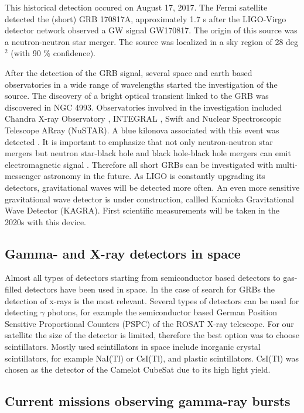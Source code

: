 \documentclass[12pt, a4paper,titlepage]{article}
\numberwithin{equation}{section}
\numberwithin{figure}{section}
\begin{document}
This historical detection occured on August 17, 2017. The Fermi satellite detected the (short) GRB 170817A, approximately 1.7 s after the LIGO-Virgo detector network observed a GW signal GW170817. The origin of this source was a neutron-neutron star merger. The source was localized  in a sky region of 28 deg$^{2}$ (with 90 \% confidence). 

After the detection of the GRB signal, several space and earth based observatories in a wide range of wavelengths started the investigation of the source. The discovery of a bright optical transient linked to the GRB was discovered in NGC 4993. Observatories involved in the investigation included Chandra X-ray Observatory \cite{grb23}, INTEGRAL \cite{grb22}, Swift and Nuclear Spectroscopic Telescope ARray (NuSTAR). A blue kilonova associated with this event was detected \cite{grb24}. It is important to emphasize that not only neutron-neutron star mergers but neutron star-black hole and black hole-black hole mergers can emit electromagnetic signal \cite{grb25}. Therefore all short GRBs can be investigated with multi-messenger astronomy in the future. As LIGO is constantly upgrading its detectors, gravitational waves will be detected more often. An even more sensitive gravitational wave detector is under construction, callled Kamioka Gravitational Wave Detector (KAGRA). First scientific measurements will be taken in the 2020s \cite{grb26} with this device.

\subsection{Gamma- and X-ray detectors in space}

Almost all types of detectors starting from semiconductor based detectors to gas-filled detectors have been used in space. In the case of search for GRBs the detection of x-rays is the most relevant. Several types of detectors can be used for detecting $\gamma$ photons\cite{grb30}, for example the semiconductor based  German Position Sensitive Proportional Counters (PSPC) of the ROSAT X-ray telescope. For our satellite the size of the detector is limited, therefore the best option was to choose scintillators. Mostly used scintillators in space include inorganic crystal scintillators, for example NaI(Tl) or CsI(Tl), and plastic scintillators. CsI(Tl) was chosen as the detector of the Camelot CubeSat due to its high light yield.

\subsection{Current missions observing gamma-ray bursts}
\end{document}
